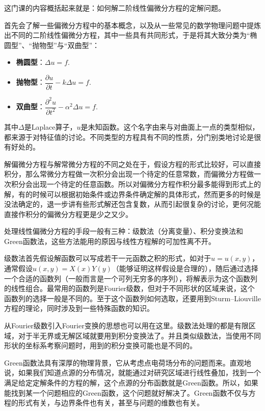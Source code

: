 这门课的内容概括起来就是：如何解二阶线性偏微分方程的定解问题。

首先会了解一些偏微分方程中的基本概念，以及从一些常见的数学物理问题中提炼出不同的二阶线性偏微分方程，其中一些具有共同形式，于是将其大致分类为“椭圆型”、“抛物型”与“双曲型”：

\begin{itemize}
	\item \textbf{椭圆型}：$\Delta u = f$.

	\item \textbf{抛物型}：$\dfrac{\partial u}{\partial t}-k\Delta u = f$.

	\item \textbf{双曲型}：$\dfrac{\partial^2 u}{\partial t^2}-\alpha^2\Delta u = f$.
\end{itemize}

其中$\Delta$是Laplace算子，$u$是未知函数。这个名字由来与对曲面上一点的类型相似，都来源于对特征值的讨论。不同类型的方程具有不同的性质，分门别类地讨论是很有好处的。 %

解偏微分方程与解常微分方程的不同之处在于，假设方程的形式比较好，可以直接积分，那么常微分方程做一次积分会出现一个待定的任意常数，而偏微分方程做一次积分会出现一个待定的任意函数。所以对偏微分方程作积分最多能得到形式上的解，有的时候可以根据初始条件或边界条件确定解的具体形式，然而更多的时候是没法确定的，退一步讲有些形式解还包含复数，从而引起很复杂的讨论，更何况能直接作积分的偏微分方程更是少之又少。

处理线性偏微分方程的手段一般有三种：级数法（分离变量）、积分变换法和Green函数法，这些方法能用的原因与线性方程解的可加性离不开。

级数法首先假设解函数可以写成若干一元函数之积的形式，如对于$u=u(x,y)$，通常假设$u(x,y)=X(x)Y(y)$（能够证明这样假设是合理的），随后通过选择一个合适的函数列（一般而言是一个可列无穷多的序列），将解表示为这个函数列的线性组合。最常用的函数列是Fourier级数，但对于不同形状的区域来说，这个函数列的选择一般是不同的。至于这个函数列如何选取，还要用到Sturm–Liouville方程的理论，同时涉及到一些特殊函数的知识。

从Fourier级数引入Fourier变换的思想也可以用在这里。级数法处理的都是有限区域，对于半无界或无解区域就要用到积分变换法了。并且类似级数法，当使用不同形状的坐标系考察问题时，用到的积分变换可能也是不同的。

Green函数法具有深厚的物理背景，它从考虑点电荷场分布的问题而来。直观地说，如果我们知道点源的分布情况，就能通过对研究区域进行线性叠加，找到一个满足给定定解条件的方程的解，这个点源的分布函数就是Green函数。所以，如果能找到某一个问题相应的Green函数，这个问题就好解决了。Green函数不仅与方程的形式有关，与边界条件也有关，甚至与问题的维数也有关。


